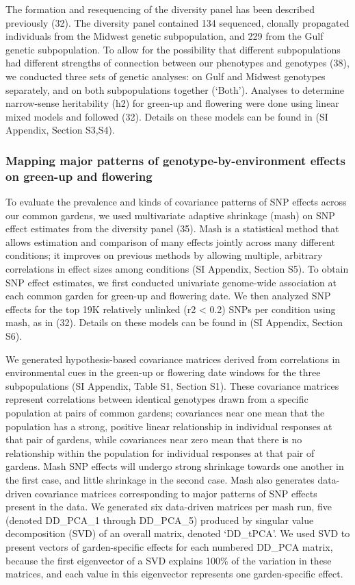 \documentclass[
  9pt,
  twocolumn,
  twoside]{pnas-new}
\begin{document}
The formation and resequencing of the diversity panel has been described
previously (32). The diversity panel contained 134 sequenced, clonally
propagated individuals from the Midwest genetic subpopulation, and 229
from the Gulf genetic subpopulation. To allow for the possibility that
different subpopulations had different strengths of connection between
our phenotypes and genotypes (38), we conducted three sets of genetic
analyses: on Gulf and Midwest genotypes separately, and on both
subpopulations together (`Both'). Analyses to determine narrow-sense
heritability (h2) for green-up and flowering were done using linear
mixed models and followed (32). Details on these models can be found in
(SI Appendix, Section S3,S4).

\subsubsection{Mapping major patterns of genotype-by-environment effects
on green-up and
flowering}\label{mapping-major-patterns-of-genotype-by-environment-effects-on-green-up-and-flowering}

To evaluate the prevalence and kinds of covariance patterns of SNP
effects across our common gardens, we used multivariate adaptive
shrinkage (mash) on SNP effect estimates from the diversity panel (35).
Mash is a statistical method that allows estimation and comparison of
many effects jointly across many different conditions; it improves on
previous methods by allowing multiple, arbitrary correlations in effect
sizes among conditions (SI Appendix, Section S5). To obtain SNP effect
estimates, we first conducted univariate genome-wide association at each
common garden for green-up and flowering date. We then analyzed SNP
effects for the top 19K relatively unlinked (r2 \textless{} 0.2) SNPs
per condition using mash, as in (32). Details on these models can be
found in (SI Appendix, Section S6).

We generated hypothesis-based covariance matrices derived from
correlations in environmental cues in the green-up or flowering date
windows for the three subpopulations (SI Appendix, Table S1, Section
S1). These covariance matrices represent correlations between identical
genotypes drawn from a specific population at pairs of common gardens;
covariances near one mean that the population has a strong, positive
linear relationship in individual responses at that pair of gardens,
while covariances near zero mean that there is no relationship within
the population for individual responses at that pair of gardens. Mash
SNP effects will undergo strong shrinkage towards one another in the
first case, and little shrinkage in the second case. Mash also generates
data-driven covariance matrices corresponding to major patterns of SNP
effects present in the data. We generated six data-driven matrices per
mash run, five (denoted DD\_PCA\_1 through DD\_PCA\_5) produced by
singular value decomposition (SVD) of an overall matrix, denoted
`DD\_tPCA'. We used SVD to present vectors of garden-specific effects
for each numbered DD\_PCA matrix, because the first eigenvector of a SVD
explains 100\% of the variation in these matrices, and each value in
this eigenvector represents one garden-specific effect.
\end{document}
